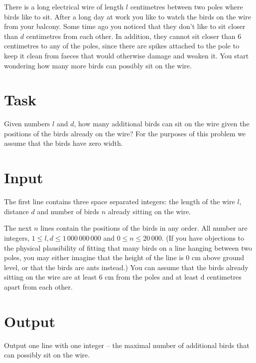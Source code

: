There is a long electrical wire of length $l$ centimetres between
two poles where birds like to sit. After a long day at work you
like to watch the birds on the wire from your balcony. Some time
ago you noticed that they don’t like to sit closer than $d$ centimetres from each other. In addition, they cannot sit closer than $6$
centimetres to any of the poles, since there are spikes attached to
the pole to keep it clean from faeces that would otherwise damage and weaken it. You start wondering how many more birds can
possibly sit on the wire.

\section*{Task}
Given numbers $l$ and $d$, how many additional birds can sit on the
wire given the positions of the birds already on the wire? For the
purposes of this problem we assume that the birds have zero width.

\section*{Input}
The first line contains three space separated integers: the length of the wire $l$, distance $d$ and number of birds
$n$ already sitting on the wire.

The next $n$ lines contain the positions of the birds in any order.
All number are integers, $1 \le l, d \le 1\,000\,000\,000$ and $0 \le n \le 20\,000$. (If you have objections to the physical plausibility of
fitting that many birds on a line hanging between two poles, you may either imagine that the height of the line is
$0$ cm above ground level, or that the birds are ants instead.) You can assume that the birds already sitting on the
wire are at least $6$ cm from the poles and at least d centimetres apart from each other.

\section*{Output}
Output one line with one integer – the maximal number of additional birds that can possibly sit on the wire.
